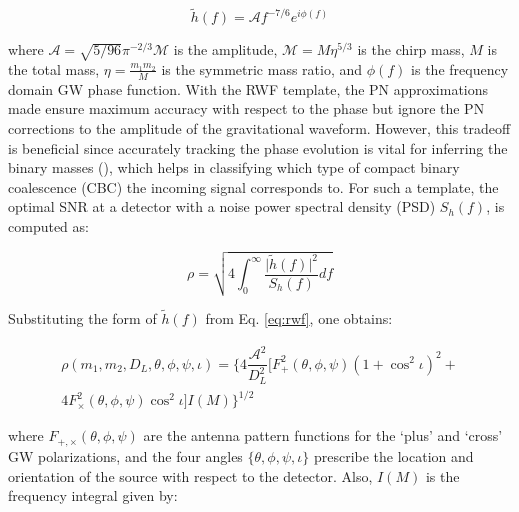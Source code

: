         \begin{equation}
            \tilde{h}(f) = \mathcal{A}f^{-7/6}e^{i\phi(f)}
            \label{eq:rwf}
        \end{equation}

        where $\mathcal{A} = \sqrt{5/96}\pi^{-2/3} \mathcal{M}$ is the amplitude,
        $\mathcal{M} = M \eta^{5/3}$ is the chirp mass, $M$ is the total mass, $\eta =
        \frac{m_1 m_2}{M}$ is the symmetric mass ratio, and $\phi(f)$ is the frequency
        domain GW phase function. With the RWF template, the PN approximations made
        ensure maximum accuracy with respect to the phase but ignore the PN corrections
        to the amplitude of the gravitational waveform. However, this tradeoff is
        beneficial since accurately tracking the phase evolution is vital for
        inferring the binary masses (\cite{poisson_1995}), which helps in classifying
        which type of compact binary coalescence (CBC) the incoming signal corresponds
        to. For such a template, the optimal SNR at a detector with a noise power
        spectral density (PSD) $S_h(f)$, is computed as:

        \begin{equation}
            \rho = \sqrt{
                            4\int_0^\infty
                            \dfrac{\lvert \tilde{h}(f) \rvert^2}{S_h(f)}
                            df
                        }
            \label{eq:rho}
        \end{equation}

        Substituting the form of $\tilde{h}(f)$ from Eq. \ref{eq:rwf}, one obtains:

        \begin{multline}
            \label{eq:rwf_optsnr}
            \rho(m_1, m_2, D_L, \theta, \phi, \psi, \iota) =
                \Big\{
                    4 \dfrac{\mathcal{A}^2}{D_L^2}
                    \Big[
                        F_{+}^2(\theta, \phi, \psi)(1 + \cos^2 \iota)^2 + \\
                        4 F_{\times}^2(\theta, \phi, \psi) \cos^2 \iota
                    \Big]
                     I(M)
                 \Big\}^{1/2}
        \end{multline}

        where $F_{+, \times}(\theta, \phi, \psi)$ are the antenna pattern functions for
        the `plus' and `cross' GW polarizations, and the four angles $\{\theta, \phi,
        \psi, \iota\}$ prescribe the location and orientation of the source with respect
        to the detector. Also, $I(M)$ is the frequency integral given by:

